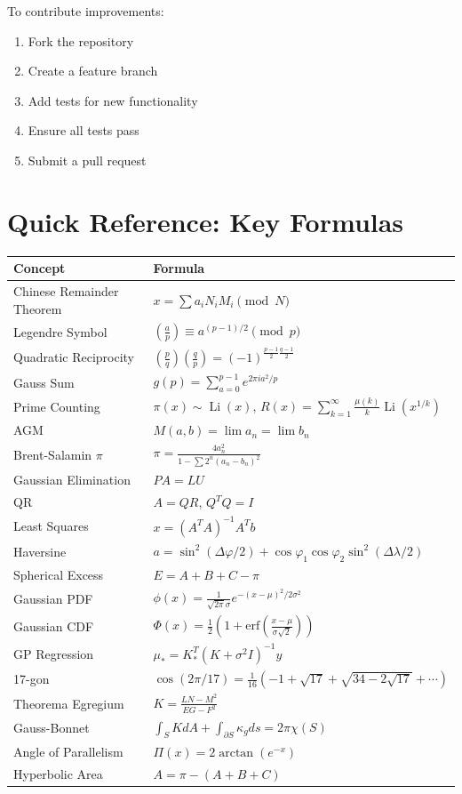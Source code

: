 \documentclass[11pt,a4paper]{article}
\begin{document}
To contribute improvements:
\begin{enumerate}
    \item Fork the repository
    \item Create a feature branch
    \item Add tests for new functionality
    \item Ensure all tests pass
    \item Submit a pull request
\end{enumerate}

\appendix

\section{Quick Reference: Key Formulas}

\begin{tabular}{ll}
\toprule
\textbf{Concept} & \textbf{Formula} \\
\midrule
Chinese Remainder Theorem & $x = \sum a_i N_i M_i \pmod{N}$ \\
Legendre Symbol & $\left(\frac{a}{p}\right) \equiv a^{(p-1)/2} \pmod{p}$ \\
Quadratic Reciprocity & $\left(\frac{p}{q}\right)\left(\frac{q}{p}\right) = (-1)^{\frac{p-1}{2}\frac{q-1}{2}}$ \\
Gauss Sum & $g(p) = \sum_{a=0}^{p-1} e^{2\pi i a^2/p}$ \\
Prime Counting & $\pi(x) \sim \operatorname{Li}(x)$, \quad $R(x) = \sum_{k=1}^{\infty}\frac{\mu(k)}{k}\operatorname{Li}(x^{1/k})$ \\
AGM & $M(a,b) = \lim a_n = \lim b_n$ \\
Brent-Salamin $\pi$ & $\pi = \frac{4a_n^2}{1-\sum 2^n(a_n-b_n)^2}$ \\
Gaussian Elimination & $PA = LU$ \\
QR & $A = QR$, $Q^TQ=I$ \\
Least Squares & $x = (A^TA)^{-1}A^Tb$ \\
Haversine & $a = \sin^2(\Delta\varphi/2) + \cos\varphi_1\cos\varphi_2\sin^2(\Delta\lambda/2)$ \\
Spherical Excess & $E = A + B + C - \pi$ \\
Gaussian PDF & $\phi(x) = \frac{1}{\sqrt{2\pi}\sigma}e^{-(x-\mu)^2/2\sigma^2}$ \\
Gaussian CDF & $\Phi(x) = \frac{1}{2}(1+\text{erf}(\frac{x-\mu}{\sigma\sqrt{2}}))$ \\
GP Regression & $\mu_* = K_*^T(K+\sigma^2I)^{-1}y$ \\
17-gon & $\cos(2\pi/17) = \frac{1}{16}(-1+\sqrt{17}+\sqrt{34-2\sqrt{17}}+\cdots)$ \\
Theorema Egregium & $K = \frac{LN-M^2}{EG-F^2}$ \\
Gauss-Bonnet & $\int_S K dA + \int_{\partial S}\kappa_g ds = 2\pi\chi(S)$ \\
Angle of Parallelism & $\Pi(x) = 2\arctan(e^{-x})$ \\
Hyperbolic Area & $A = \pi - (A+B+C)$ \\
\bottomrule
\end{tabular}
\end{document}
